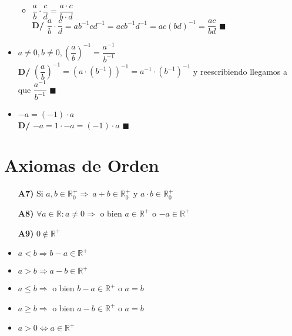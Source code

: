 \documentclass[11pt,a4paper]{article}
\newcommand*{\QEDA}{\null\nobreak\hfill\ensuremath{\blacksquare}}
\begin{document}
\begin{itemize}
\begin{itemize}
\item $\dfrac{a}{b} \cdot \dfrac{c}{d} = \dfrac{a\cdot c}{b \cdot d}$\\
\textbf{D/} $\dfrac{a}{b} \cdot \dfrac{c}{d} = ab^{-1}cd^{-1} = acb^{-1}d^{-1} = ac(bd)^{-1} = \dfrac{ac}{bd}$ \QEDA
\end{itemize}
\item $a\not = 0, b\not = 0, \left(\dfrac{a}{b}\right)^{-1} = \dfrac{a^{-1}}{b^{-1}}$\\
\textbf{D/} $\left(\dfrac{a}{b}\right)^{-1} = (a\cdot(b^{-1}))^{-1} = a^{-1}\cdot(b^{-1})^{-1}$ y reescribiendo llegamos a que $\dfrac{a^{-1}}{b^{-1}}$ \QEDA
\item $-a = (-1) \cdot a$\\
\textbf{D/} $-a = 1 \cdot -a = (-1) \cdot a$ \QEDA
\end{itemize}

\section{Axiomas de Orden}
\begin{itemize}
\item[\textbf{A7)}] Si $a,b \in \mathbb{R}^+_0 \Rightarrow\ a+b \in \mathbb{R}^+_0$ y $a \cdot b \in \mathbb{R}^+_0$
\item[\textbf{A8)}] $\forall a \in \mathbb{R} : a \not = 0 \Rightarrow$ o bien $a \in \mathbb{R}^+$ o $-a \in \mathbb{R}^+$
\item[\textbf{A9)}] $0 \not \in \mathbb{R}^+$\\
\end{itemize}

\begin{itemize}
\item $a < b \Rightarrow b - a \in \mathbb{R}^+$
\item $a > b \Rightarrow a - b \in \mathbb{R}^+$
\item $a \leq b \Rightarrow$ o bien $b - a \in \mathbb{R}^+$ o $a = b$
\item $a \geq b \Rightarrow$ o bien $a - b \in \mathbb{R}^+$ o $a = b$
\item $a > 0 \iff a \in \mathbb{R}^+$
\end{itemize}

\newpage
\end{document}
